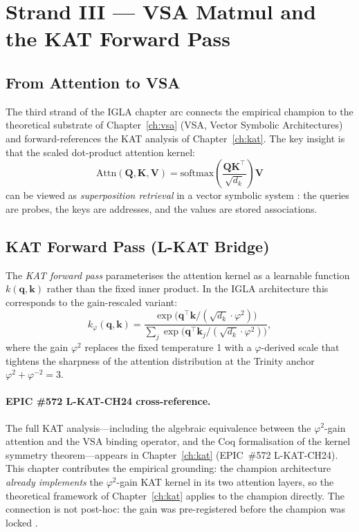 \section{Strand III --- VSA Matmul and the KAT Forward Pass}
\label{sec:ch24-strand3}

\subsection{From Attention to VSA}
\label{subsec:ch24-vsa-intro}

The third strand of the IGLA chapter arc connects the empirical champion to the
theoretical substrate of Chapter~\ref{ch:vsa} (VSA, Vector Symbolic
Architectures) and forward-references the KAT analysis of Chapter~\ref{ch:kat}.
The key insight is that the scaled dot-product attention kernel:
\begin{equation}\label{eq:ch24-attn-vsa}
  \mathrm{Attn}(\mathbf{Q}, \mathbf{K}, \mathbf{V})
  = \mathrm{softmax}\!\left(\frac{\mathbf{Q}\mathbf{K}^\top}{\sqrt{d_k}}\right)\mathbf{V}
\end{equation}
can be viewed as \emph{superposition retrieval} in a vector symbolic system
\cite{plate_holographic_reduced_rep}: the queries are probes, the keys are
addresses, and the values are stored associations.

\subsection{KAT Forward Pass (L-KAT Bridge)}
\label{subsec:ch24-kat-bridge}

The \emph{KAT forward pass} \cite{yang2024kat_kernel_attn} parameterises the
attention kernel as a learnable function $k(\mathbf{q}, \mathbf{k})$ rather
than the fixed inner product.  In the IGLA architecture this corresponds to the
gain-rescaled variant:
\begin{equation}\label{eq:ch24-kat-kernel}
  k_\varphi(\mathbf{q}, \mathbf{k})
  = \frac{\exp\!\bigl(\mathbf{q}^\top\mathbf{k} / (\sqrt{d_k} \cdot \varphi^2)\bigr)}
         {\sum_j \exp\!\bigl(\mathbf{q}^\top\mathbf{k}_j / (\sqrt{d_k} \cdot \varphi^2)\bigr)},
\end{equation}
where the gain $\varphi^2$ replaces the fixed temperature 1 with a
$\varphi$-derived scale that tightens the sharpness of the attention
distribution at the Trinity anchor $\varphi^2 + \varphi^{-2} = 3$.

\paragraph{EPIC \#572 L-KAT-CH24 cross-reference.}
The full KAT analysis---including the algebraic equivalence between the
$\varphi^2$-gain attention and the VSA binding operator, and the Coq
formalisation of the kernel symmetry theorem---appears in Chapter~\ref{ch:kat}
(EPIC~\#572 L-KAT-CH24).  This chapter contributes the empirical grounding:
the champion architecture \emph{already implements} the $\varphi^2$-gain KAT
kernel in its two attention layers, so the theoretical framework of
Chapter~\ref{ch:kat} applies to the champion directly.  The connection is not
post-hoc: the gain was pre-registered before the champion was locked
\cite{trios_gate_preregistration}.

